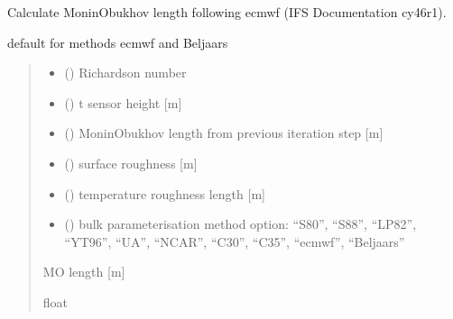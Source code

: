 \documentclass[letterpaper,10pt,english]{sphinxmanual}
\begin{document}

\begin{fulllineitems}
\label{\detokenize{users_guide:AirSeaFluxCode.flux_subs.get_LRb}}
\pysigstartsignatures
\pysiglinewithargsret
{}
{\sphinxparamcomma {}\sphinxparamcomma {}\sphinxparamcomma {}\sphinxparamcomma {}\sphinxparamcomma {}}
{}
\pysigstopsignatures
\sphinxAtStartPar
Calculate Monin\sphinxhyphen{}Obukhov length following ecmwf (IFS Documentation cy46r1).

\sphinxAtStartPar
default for methods ecmwf and Beljaars
\begin{quote}\begin{description}
\begin{itemize}
\item {}
\sphinxAtStartPar
{} () \textendash{} Richardson number

\item {}
\sphinxAtStartPar
{} () \textendash{} t sensor height {[}m{]}

\item {}
\sphinxAtStartPar
{} () \textendash{} Monin\sphinxhyphen{}Obukhov length from previous iteration step {[}m{]}

\item {}
\sphinxAtStartPar
{} () \textendash{} surface roughness       {[}m{]}

\item {}
\sphinxAtStartPar
{} () \textendash{} temperature roughness length       {[}m{]}

\item {}
\sphinxAtStartPar
{} () \textendash{} bulk parameterisation method option: “S80”, “S88”, “LP82”, “YT96”,
“UA”, “NCAR”, “C30”, “C35”, “ecmwf”, “Beljaars”

\end{itemize}

\sphinxAtStartPar
{} \textendash{} M\sphinxhyphen{}O length {[}m{]}

\sphinxAtStartPar
float

\end{description}\end{quote}

\end{fulllineitems}
\end{document}
